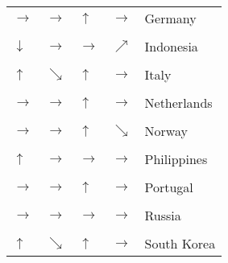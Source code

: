 \begin{table}[!h]
\begin{tabular}[t]{lllll}
$\rightarrow$ & $\rightarrow$ & $\uparrow$ & $\rightarrow$ & Germany\\
\cellcolor{gray!6}{$\downarrow$} & \cellcolor{gray!6}{$\nearrow$} & \cellcolor{gray!6}{$\rightarrow$} & \cellcolor{gray!6}{$\nearrow$} & \cellcolor{gray!6}{India}\\
\addlinespace
$\downarrow$ & $\rightarrow$ & $\rightarrow$ & $\nearrow$ & Indonesia\\
\cellcolor{gray!6}{$\uparrow$} & \cellcolor{gray!6}{$\rightarrow$} & \cellcolor{gray!6}{$\uparrow$} & \cellcolor{gray!6}{$\rightarrow$} & \cellcolor{gray!6}{Ireland}\\
$\uparrow$ & $\searrow$ & $\uparrow$ & $\rightarrow$ & Italy\\
\cellcolor{gray!6}{$\rightarrow$} & \cellcolor{gray!6}{$\rightarrow$} & \cellcolor{gray!6}{$\uparrow$} & \cellcolor{gray!6}{$\nearrow$} & \cellcolor{gray!6}{Mexico}\\
$\rightarrow$ & $\rightarrow$ & $\uparrow$ & $\rightarrow$ & Netherlands\\
\addlinespace
\cellcolor{gray!6}{$\uparrow$} & \cellcolor{gray!6}{$\searrow$} & \cellcolor{gray!6}{$\uparrow$} & \cellcolor{gray!6}{$\rightarrow$} & \cellcolor{gray!6}{New Zealand}\\
$\rightarrow$ & $\rightarrow$ & $\uparrow$ & $\searrow$ & Norway\\
\cellcolor{gray!6}{$\rightarrow$} & \cellcolor{gray!6}{$\nearrow$} & \cellcolor{gray!6}{$\rightarrow$} & \cellcolor{gray!6}{$\nearrow$} & \cellcolor{gray!6}{Pakistan}\\
$\uparrow$ & $\rightarrow$ & $\rightarrow$ & $\rightarrow$ & Philippines\\
\cellcolor{gray!6}{$\uparrow$} & \cellcolor{gray!6}{$\rightarrow$} & \cellcolor{gray!6}{$\uparrow$} & \cellcolor{gray!6}{$\rightarrow$} & \cellcolor{gray!6}{Poland}\\
\addlinespace
$\rightarrow$ & $\rightarrow$ & $\uparrow$ & $\rightarrow$ & Portugal\\
\cellcolor{gray!6}{$\uparrow$} & \cellcolor{gray!6}{$\searrow$} & \cellcolor{gray!6}{$\uparrow$} & \cellcolor{gray!6}{$\rightarrow$} & \cellcolor{gray!6}{Romania}\\
$\rightarrow$ & $\rightarrow$ & $\rightarrow$ & $\rightarrow$ & Russia\\
\cellcolor{gray!6}{$\rightarrow$} & \cellcolor{gray!6}{$\rightarrow$} & \cellcolor{gray!6}{$\uparrow$} & \cellcolor{gray!6}{$\rightarrow$} & \cellcolor{gray!6}{South Africa}\\
$\uparrow$ & $\searrow$ & $\uparrow$ & $\rightarrow$ & South Korea\\

\end{tabular}
\end{table}

